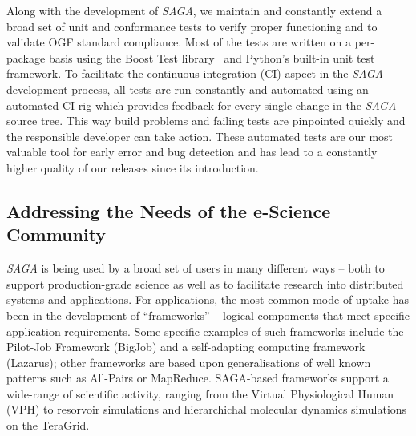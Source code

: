 \documentclass[a4paper,10pt]{article}
\newcommand{\sagaimpl}{\textit{SAGA}\xspace}
\newcommand{\impl}{\sagaimpl}
\newcommand{\note}[1]{ {\textcolor{red} { ***NOTE: #1 }}}
\newcommand{\jhanote}[1]{  {\textcolor{red}     { ***Shantenu: #1 }}}
\newcommand{\jhanote}[1]{}
\begin{document}
 Along with the development of \impl, we maintain and constantly
 extend a broad set of unit and conformance tests to verify proper
 functioning and to validate OGF standard compliance. Most of the
 tests are written on a per-package basis using the Boost Test
 library~\cite{boost_test_web} and Python's built-in unit test
 framework. To facilitate the continuous integration (CI) aspect in
 the \impl development process, all tests are run constantly and
 automated using an automated CI rig\cite{buildbot_web} which provides
 feedback for every single change in the \impl source tree. This way
 build problems and failing tests are pinpointed quickly and the
 responsible developer can take action. These automated tests are  our
 most valuable tool for early error and bug detection and has lead to
 a constantly higher quality of our releases since its introduction.

\vspace{-0.8em}

\subsection*{Addressing the Needs of the e-Science Community}
\vspace{-0.5em}

 \impl is being used by a broad set of users in many different ways -- both to
 support production-grade science as well as to facilitate research into
 distributed systems and applications.  For applications, the most common mode
 of uptake has been in the development of ``frameworks'' -- logical compoments
 that meet specific application requirements. Some specific examples of such
 frameworks include the Pilot-Job Framework (BigJob) and a self-adapting
 computing framework (Lazarus); other frameworks are based upon generalisations
 of well known patterns such as All-Pairs or MapReduce.  SAGA-based frameworks
 support a wide-range of scientific activity, ranging from the Virtual
 Physiological Human (VPH) to resorvoir simulations and hierarchichal molecular
 dynamics simulations on the TeraGrid.
\end{document}
